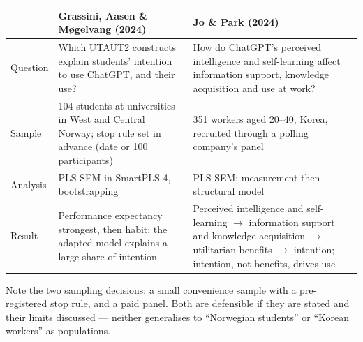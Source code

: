 \documentclass[11pt,a4paper,british,twoside=false,headings=small,chapterprefix=false,numbers=noenddot]{scrbook}
\begin{document}
\begin{center}\small
\footnotesize
  \renewcommand{\arraystretch}{1.3}
  \begin{tabular}{@{}p{2.2cm}p{5.3cm}p{5.5cm}@{}}
    \toprule
    & \textbf{Grassini, Aasen \& M\o gelvang (2024)} & \textbf{Jo \& Park (2024)}\\
    \midrule
    Question & Which UTAUT2 constructs explain students' intention to use ChatGPT, and their use? & How do ChatGPT's perceived intelligence and self-learning affect information support, knowledge acquisition and use at work?\\
    Sample & 104 students at universities in West and Central Norway; stop rule set in advance (date or 100 participants) & 351 workers aged 20--40, Korea, recruited through a polling company's panel\\
    Analysis & PLS-SEM in SmartPLS 4, bootstrapping & PLS-SEM; measurement then structural model\\
    Result & Performance expectancy strongest, then habit; the adapted model explains a large share of intention & Perceived intelligence and self-learning $\rightarrow$ information support and knowledge acquisition $\rightarrow$ utilitarian benefits $\rightarrow$ intention; intention, not benefits, drives use\\
    \bottomrule
  \end{tabular}
  

  \small Note the two sampling decisions: a small convenience sample with a
  pre-registered stop rule, and a paid panel. Both are defensible if they are
  stated and their limits discussed --- neither generalises to ``Norwegian
  students'' or ``Korean workers'' as populations.
\end{center}
\end{document}
